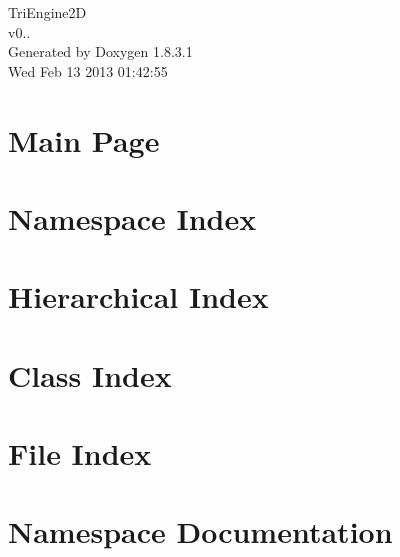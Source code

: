 \documentclass{book}
\begin{document}
\hypersetup{pageanchor=false,citecolor=blue}
\begin{titlepage}
\vspace*{7cm}
\begin{center}
{\Large Tri\-Engine2\-D \\[1ex]\large v0.. }\\
\vspace*{1cm}
{\large Generated by Doxygen 1.8.3.1}\\
\vspace*{0.5cm}
{\small Wed Feb 13 2013 01:42:55}\\
\end{center}
\end{titlepage}
\clearemptydoublepage
{}
\tableofcontents
\clearemptydoublepage
{}
\hypersetup{pageanchor=true,citecolor=blue}
\chapter{Main Page}
\label{index}\hypertarget{index}{}
\chapter{Namespace Index}

\chapter{Hierarchical Index}

\chapter{Class Index}

\chapter{File Index}

\chapter{Namespace Documentation}









\end{document}
